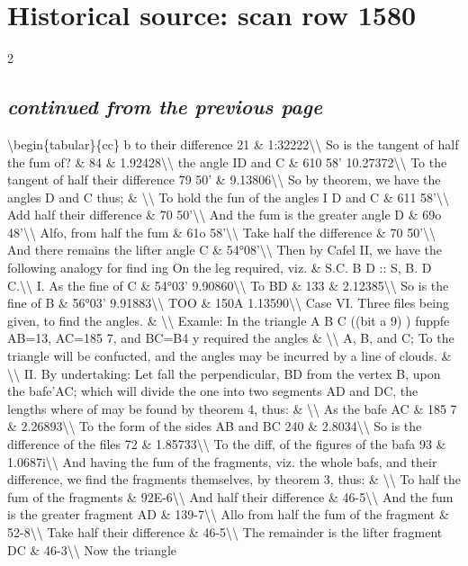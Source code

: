 \documentclass[10pt]{article}
\begin{document}
\section*{Historical source: scan row 1580}
\begin{multicols}{2}
\subsection*{\textit{continued from the previous page}}
\textbackslash{}begin\{tabular\}\{cc\} b to their difference 21 \& 1:32222\textbackslash{}\textbackslash{} So is the tangent of half the fum of? \& 84 \& 1.92428\textbackslash{}\textbackslash{} the angle ID and C \& 610 58' 10.27372\textbackslash{}\textbackslash{} To the tangent of half their difference 79 50' \& 9.13806\textbackslash{}\textbackslash{} So by theorem, we have the angles D and C thus; \& \textbackslash{}\textbackslash{} To hold the fun of the angles I D and C \& 611 58'\textbackslash{}\textbackslash{} Add half their difference \& 70 50'\textbackslash{}\textbackslash{} And the fum is the greater angle D \& 69o 48'\textbackslash{}\textbackslash{} Alfo, from half the fum \& 61o 58'\textbackslash{}\textbackslash{} Take half the difference \& 70 50'\textbackslash{}\textbackslash{} And there remains the lifter angle C \& 54°08'\textbackslash{}\textbackslash{} Then by Cafel II, we have the following analogy for find ing On the leg required, viz. \& S.C. B D :: S, B. D C.\textbackslash{}\textbackslash{} I. As the fine of C \& 54°03' 9.90860\textbackslash{}\textbackslash{} To BD \& 133 \& 2.12385\textbackslash{}\textbackslash{} So is the fine of B \& 56°03' 9.91883\textbackslash{}\textbackslash{} TOO \& 150A 1.13590\textbackslash{}\textbackslash{} Case VI. Three files being given, to find the angles. \& \textbackslash{}\textbackslash{} Examle: In the triangle A B C ((bit a 9) ) fuppfe AB=13, AC=185 7, and BC=B4 y required the angles \& \textbackslash{}\textbackslash{} A, B, and C; To the triangle will be confucted, and the angles may be incurred by a line of clouds. \& \textbackslash{}\textbackslash{} II. By undertaking: Let fall the perpendicular, BD from the vertex B, upon the bafe’AC; which will divide the one into two segments AD and DC, the lengths where of may be found by theorem 4, thus: \& \textbackslash{}\textbackslash{} As the bafe AC \& 185 7 \& 2.26893\textbackslash{}\textbackslash{} To the form of the sides AB and BC 240 \& 2.8034\textbackslash{}\textbackslash{} So is the difference of the files 72 \& 1.85733\textbackslash{}\textbackslash{} To the diff, of the figures of the bafa 93 \& 1.0687i\textbackslash{}\textbackslash{} And having the fum of the fragments, viz. the whole bafs, and their difference, we find the fragments themselves, by theorem 3, thus: \& \textbackslash{}\textbackslash{} To half the fum of the fragments \& 92E-6\textbackslash{}\textbackslash{} And half their difference \& 46-5\textbackslash{}\textbackslash{} And the fum is the greater fragment AD \& 139-7\textbackslash{}\textbackslash{} Allo from half the fum of the fragment \& 52-8\textbackslash{}\textbackslash{} Take half their difference \& 46-5\textbackslash{}\textbackslash{} The remainder is the lifter fragment DC \& 46-3\textbackslash{}\textbackslash{} Now the triangle 
\end{multicols}
\end{document}
